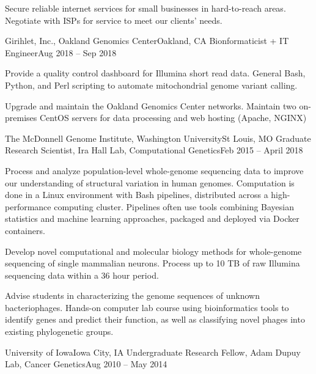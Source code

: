 {Secure reliable internet services for small businesses in hard-to-reach areas. Negotiate with ISPs for service to meet our clients' needs.}

\resumeItemListEnd

\resumeSubheading
{Girihlet, Inc., Oakland Genomics Center}{Oakland, CA}
{Bionformaticist + IT Engineer}{Aug 2018 -- Sep 2018}

\resumeItemListStart

{Provide a quality control dashboard for Illumina short read data. General Bash, Python, and Perl scripting to automate mitochondrial genome variant calling.}

{Upgrade and maintain the Oakland Genomics Center networks. Maintain two on-premises CentOS servers for data processing and web hosting (Apache, NGINX)}

\resumeItemListEnd

\resumeSubheading
{The McDonnell Genome Institute, Washington University}{St Louis, MO}
{Graduate Research Scientist, Ira Hall Lab, Computational Genetics}{Feb 2015 -- April 2018}

\resumeItemListStart

{Process and analyze population-level whole-genome sequencing data to improve our understanding of structural variation in human genomes. Computation is done in a Linux environment with Bash pipelines, distributed across a high-performance computing cluster. Pipelines often use tools combining Bayesian statistics and machine learning approaches, packaged and deployed via Docker containers.}

{Develop novel computational and molecular biology methods for whole-genome sequencing of single mammalian neurons. Process up to 10 TB of raw Illumina sequencing data within a 36 hour period.}

{Advise students in characterizing the genome sequences of unknown bacteriophages. Hands-on computer lab course using bioinformatics tools to identify genes and predict their function, as well as classifying novel phages into existing phylogenetic groups.}

\resumeItemListEnd

\resumeSubheading
{University of Iowa}{Iowa City, IA}
{Undergraduate Research Fellow, Adam Dupuy Lab, Cancer Genetics}{Aug 2010 -- May 2014}

